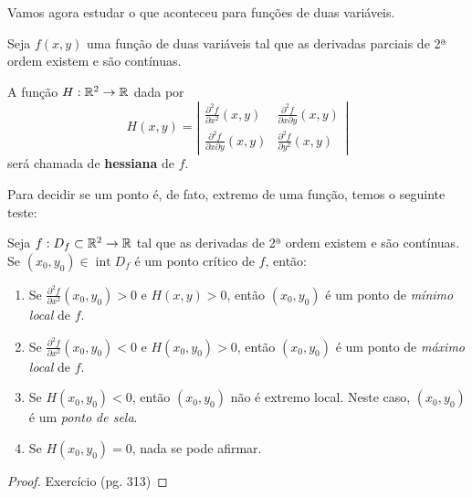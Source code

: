 Vamos agora estudar o que aconteceu para funções de duas variáveis.

Seja \(f(x,y)\) uma função de duas variáveis tal que as derivadas parciais de 2ª ordem existem e são contínuas.

\begin{definition}
    A função \(H:\mathbb{R}^2 \to \mathbb{R}\) dada por \[H(x,y) = \left|\begin{matrix}
        \frac{\partial^2 f}{\partial x^2}(x,y) & \frac{\partial^2 f}{\partial x \partial y}(x,y) \\
        \frac{\partial^2 f}{\partial x \partial y}(x,y) & \frac{\partial^2 f}{\partial y^2}(x,y)
    \end{matrix}\right|\] será chamada de \textbf{hessiana} de \(f\).
\end{definition}

Para decidir se um ponto é, de fato, extremo de uma função, temos o seguinte teste:
\begin{theorem}
    Seja \(f: D_f \subset \mathbb{R}^2 \to \mathbb{R} \) tal que as derivadas de 2ª ordem existem e são contínuas. Se \((x_0,y_0)\in\operatorname{int} D_f\) é um ponto crítico de \(f\), então:
        \begin{enumerate}
            \item Se \(\frac{\partial^2 f}{\partial x^2}(x_0,y_0) > 0\) e \(H(x,y) > 0\), então \((x_0,y_0)\) é um ponto de \textit{mínimo local} de \(f\).
            \item Se \(\frac{\partial^2 f}{\partial x^2}(x_0,y_0) < 0\) e \(H(x_0,y_0) > 0\), então \((x_0,y_0)\) é um ponto de \textit{máximo local} de \(f\).
            \item Se \(H(x_0,y_0) < 0\), então \((x_0,y_0)\) não é extremo local. Neste caso, \((x_0,y_0)\) é um \textit{ponto de sela}.
            \item Se \(H(x_0,y_0) = 0\), nada se pode afirmar.
        \end{enumerate}
\end{theorem}
\begin{proof}
    Exercício \cite{guidorizzi}(pg. 313)
\end{proof}

